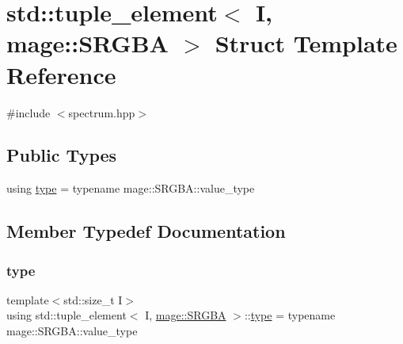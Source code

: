 \hypertarget{structstd_1_1tuple__element_3_01_i_00_01mage_1_1_s_r_g_b_a_01_4}{}\section{std\+:\+:tuple\+\_\+element$<$ I, mage\+:\+:S\+R\+G\+BA $>$ Struct Template Reference}
\label{structstd_1_1tuple__element_3_01_i_00_01mage_1_1_s_r_g_b_a_01_4}


{\ttfamily \#include $<$spectrum.\+hpp$>$}

\subsection*{Public Types}
\begin{DoxyCompactItemize}
\item 
using \mbox{\hyperlink{structstd_1_1tuple__element_3_01_i_00_01mage_1_1_s_r_g_b_a_01_4_a96b1a30440a23f511ffb8996813f821e}{type}} = typename mage\+::\+S\+R\+G\+B\+A\+::value\+\_\+type
\end{DoxyCompactItemize}


\subsection{Member Typedef Documentation}
\mbox{\label{structstd_1_1tuple__element_3_01_i_00_01mage_1_1_s_r_g_b_a_01_4_a96b1a30440a23f511ffb8996813f821e}} 
\subsubsection{\texorpdfstring{type}{type}}
{\footnotesize\ttfamily template$<$std\+::size\+\_\+t I$>$ \\
using std\+::tuple\+\_\+element$<$ I, \mbox{\hyperlink{structmage_1_1_s_r_g_b_a}{mage\+::\+S\+R\+G\+BA}} $>$\+::\mbox{\hyperlink{structstd_1_1tuple__element_3_01_i_00_01mage_1_1_s_r_g_b_a_01_4_a96b1a30440a23f511ffb8996813f821e}{type}} =  typename mage\+::\+S\+R\+G\+B\+A\+::value\+\_\+type}

